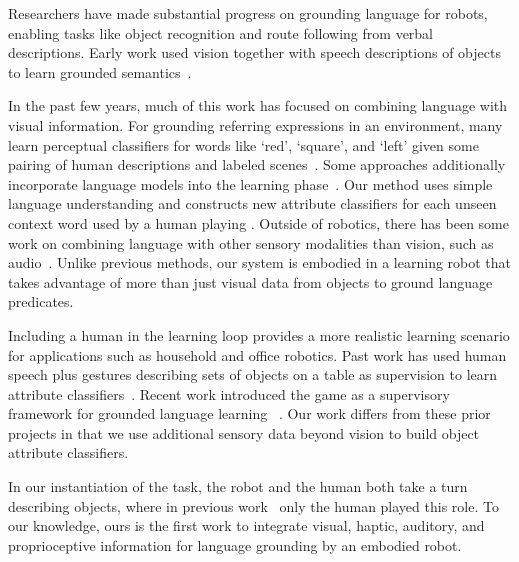 Researchers have made substantial progress on grounding language for robots,
enabling tasks like object recognition and route following from verbal
descriptions.  Early work used vision together with speech descriptions of
objects to learn grounded semantics~\cite{roy:cogsci02}.

In the past few years, much of this work has focused on combining language with
visual information.  For grounding referring expressions in an environment,
many learn perceptual classifiers for words like `red', `square', and `left'
given some pairing of human descriptions and labeled
scenes~\cite{liu:acl14,malinowski:nips14,mohan:acs13,sun:icra13,dindo:iros10,vogel:aaai10}.
Some approaches additionally incorporate language models into the learning
phase~\cite{spranger:ijcai15,krishnamurthy:acl13,perera:aaai13,matuszek:icml12}.
Our method uses simple language understanding and constructs new attribute
classifiers for each unseen context word used by a human playing \ispy.
Outside of robotics, there has been some work on combining language with other
sensory modalities than vision, such as audio~\cite{kiela:emnlp15}.  Unlike
previous methods, our system is embodied in a learning robot that takes
advantage of more than just visual data from objects to ground language
predicates.

Including a human in the learning loop provides a more realistic learning
scenario for applications such as household and office robotics.  Past work has
used human speech plus gestures describing sets of objects on a table as
supervision to learn attribute classifiers~\cite{matuszek:aaai14,kollar:rss13}.
Recent work introduced the \ispy game as a supervisory framework for grounded
language learning ~\cite{parde:ijcai15}.  Our work differs from these prior
projects in that we use additional sensory data beyond vision to build
object attribute classifiers.

In our instantiation of the \ispy task, the robot and the human both take a
turn describing objects, where in previous work~\cite{parde:ijcai15} only
the human played this role.  To our knowledge, ours is the first work to
integrate visual, haptic, auditory, and proprioceptive information for language
grounding by an embodied robot.

